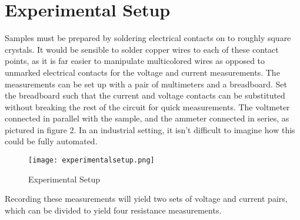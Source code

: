 \section{Experimental Setup}
Samples must be prepared by soldering electrical contacts on to roughly square crystals. It would be sensible to solder copper wires to each of these contact points, as it is far easier to manipulate multicolored wires as opposed to unmarked electrical contacts for the voltage and current measurements. The measurements can be set up with a pair of multimeters and a breadboard. Set the breadboard such that the current and voltage contacts can be substituted without breaking the rest of the circuit for quick measurements. The voltmeter connected in parallel with the sample, and the ammeter connected in series, as pictured in figure 2. In an industrial setting, it isn’t difficult to imagine how this could be fully automated.

\begin{figure}[hbt!]
\centering
\texttt{[image: experimentalsetup.png]}
\caption{Experimental Setup}\label{fig:ligma}
\end{figure}

Recording these measurements will yield two sets of voltage and current pairs, which can be divided to yield four resistance measurements.


